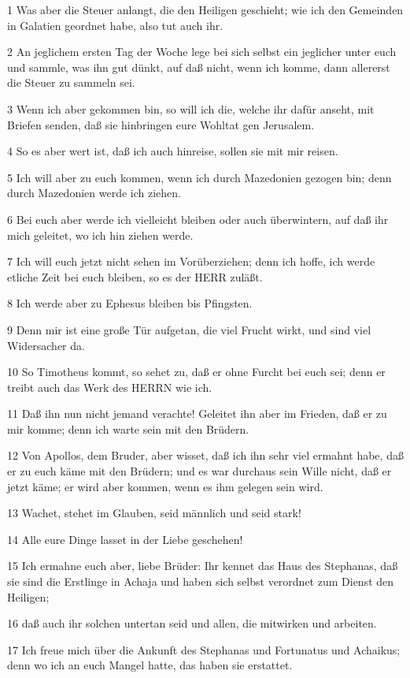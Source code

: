 \par 1 Was aber die Steuer anlangt, die den Heiligen geschieht; wie ich den Gemeinden in Galatien geordnet habe, also tut auch ihr.
\par 2 An jeglichem ersten Tag der Woche lege bei sich selbst ein jeglicher unter euch und sammle, was ihn gut dünkt, auf daß nicht, wenn ich komme, dann allererst die Steuer zu sammeln sei.
\par 3 Wenn ich aber gekommen bin, so will ich die, welche ihr dafür anseht, mit Briefen senden, daß sie hinbringen eure Wohltat gen Jerusalem.
\par 4 So es aber wert ist, daß ich auch hinreise, sollen sie mit mir reisen.
\par 5 Ich will aber zu euch kommen, wenn ich durch Mazedonien gezogen bin; denn durch Mazedonien werde ich ziehen.
\par 6 Bei euch aber werde ich vielleicht bleiben oder auch überwintern, auf daß ihr mich geleitet, wo ich hin ziehen werde.
\par 7 Ich will euch jetzt nicht sehen im Vorüberziehen; denn ich hoffe, ich werde etliche Zeit bei euch bleiben, so es der HERR zuläßt.
\par 8 Ich werde aber zu Ephesus bleiben bis Pfingsten.
\par 9 Denn mir ist eine große Tür aufgetan, die viel Frucht wirkt, und sind viel Widersacher da.
\par 10 So Timotheus kommt, so sehet zu, daß er ohne Furcht bei euch sei; denn er treibt auch das Werk des HERRN wie ich.
\par 11 Daß ihn nun nicht jemand verachte! Geleitet ihn aber im Frieden, daß er zu mir komme; denn ich warte sein mit den Brüdern.
\par 12 Von Apollos, dem Bruder, aber wisset, daß ich ihn sehr viel ermahnt habe, daß er zu euch käme mit den Brüdern; und es war durchaus sein Wille nicht, daß er jetzt käme; er wird aber kommen, wenn es ihm gelegen sein wird.
\par 13 Wachet, stehet im Glauben, seid männlich und seid stark!
\par 14 Alle eure Dinge lasset in der Liebe geschehen!
\par 15 Ich ermahne euch aber, liebe Brüder: Ihr kennet das Haus des Stephanas, daß sie sind die Erstlinge in Achaja und haben sich selbst verordnet zum Dienst den Heiligen;
\par 16 daß auch ihr solchen untertan seid und allen, die mitwirken und arbeiten.
\par 17 Ich freue mich über die Ankunft des Stephanas und Fortunatus und Achaikus; denn wo ich an euch Mangel hatte, das haben sie erstattet.
